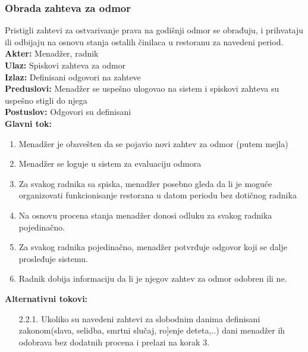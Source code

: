 \documentclass{article}
\begin{document}
\subsubsection{Obrada zahteva za odmor}
Pristigli zahtevi za ostvarivanje prava na godišnji odmor se obrađuju, i prihvataju ili odbijaju na osnovu stanja ostalih činilaca u restoranu za navedeni period.
\textbf{Akter:} Menadžer, radnik\\
\textbf{Ulaz:} Spiskovi zahteva za odmor\\
\textbf{Izlaz:} Definisani odgovori na zahteve\\
\textbf{Preduslovi:} Menadžer se uspešno ulogovao na sistem i spiskovi zahteva su uspešno stigli do njega\\
\textbf{Postuslov:} Odgovori su definisani\\
\textbf{Glavni tok:}
\begin{enumerate}
\item Menadžer je obavešten da se pojavio novi zahtev za odmor (putem mejla)
\item Menadžer se loguje u sistem za evaluaciju odmora
\item Za svakog radnika sa spiska, menadžer posebno gleda da li je moguće organizovati funkcionisanje restorana u datom periodu bez dotičnog radnika
\item Na osnovu procena stanja menadžer donosi odluku za svakog radnika pojedinačno.
\item Za svakog radnika pojedinačno, menadžer potvrđuje odgovor koji se dalje prosleđuje sistemu.
\item Radnik dobija informaciju da li je njegov zahtev za odmor odobren ili ne.
\end{enumerate}
\textbf{Alternativni tokovi:}\\
\begin{itemize}
\item[2.2.1.] Ukoliko su navedeni zahtevi za slobodnim danima definisani zakonom(slava, selidba, smrtni slučaj, ro]enje deteta,..) dani menadžer ih odobrava bez dodatnih procena i prelazi na korak 3.
\end{itemize}
\end{document}

